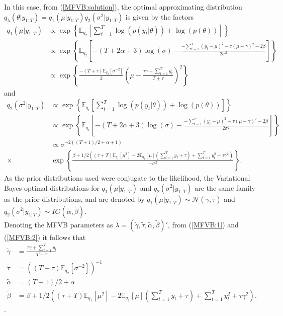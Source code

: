 \documentclass[
12pt, %
onehalfspacing, %
nohyperref, %
headsepline, %
chapterinoneline, %
]{MastersDoctoralThesis} %
\begin{document}
In this case, from (\ref{MFVB:solution}), the optimal approximating distribution  \\ $q_{\lambda}(\theta | y_{1:T}) = q_1(\mu | y_{1:T})q_2(\sigma^2 | y_{1:T})$ is given by the factors
\begin{align}
q_1(\mu | y_{1:T}) &\propto \exp \left\{\mathbb{E}_{q_2} \left[ \sum_{t=1}^T \log(p(y_t | \theta)) + \log(p(\theta)) \right] \right\} \\ 
&\propto \exp \left\{ \mathbb{E}_{q_2} \left[ -(T + 2\alpha + 3)\log(\sigma) - \frac{-\sum_{t=1}^T (y_t - \mu)^2 -\tau (\mu - \gamma)^2 - 2\beta}{2 \sigma^2} \right] \right\} \\
&\propto \exp \left\{ \frac{-(T + \tau) \mathbb{E}_{q_2}[\sigma^{-2}]}{2} \left( \mu - \frac{\tau \gamma + \sum_{t=1}^{T} y_t}{T + \tau} \right)^2 \right\} \label{MFVB:1}
\end{align}
and
\begin{align}
q_2(\sigma^2 | y_{1:T})  &\propto \exp \left\{\mathbb{E}_{q_1} \left[ \sum_{t=1}^T \log(p(y_t | \theta)) + \log(p(\theta)) \right] \right\} \\ 
&\propto \exp \left\{ \mathbb{E}_{q_1} \left[ -(T + 2\alpha + 3)\log(\sigma) - \frac{-\sum_{t=1}^T (y_t - \mu)^2 -\tau (\mu - \gamma)^2 - 2\beta}{2 \sigma^2} \right] \right\} \\
&\propto \sigma^{-2((T+1)/2 + \alpha + 1)} \nonumber \\
\times &\exp \left\{ \frac{ \beta + 1/2\left((\tau + T)\mathbb{E}_{q_1}[\mu^2] - 2 \mathbb{E}_{q_1}[\mu ]\left(\sum_{t=1}^{T}y_t + \tau \right) + \sum_{t=1}^{T} y_t^2 + \tau \gamma^2\right)}{-\sigma^2} \right\}. \label{MFVB:2}
\end{align}
As the prior distributions used were conjugate to the likelihood, the Variational Bayes optimal distributions for $q_1(\mu |  y_{1:T})$ and $q_2(\sigma^2 | y_{1:T})$ are the same family as the prior distributions, and are denoted by $q_1(\mu | y_{1:T}) \sim \mathcal{N}(\tilde{\gamma}, \tilde{\tau})$ and $q_2(\sigma^2 | y_{1:T}) \sim IG(\tilde{\alpha}, \tilde{\beta})$. 
\\

Denoting the MFVB parameters as $\lambda = (\tilde{\gamma}, \tilde{\tau}, \tilde{\alpha}, \tilde{\beta})'$, from (\ref{MFVB:1}) and (\ref{MFVB:2}) it follows that
\begin{align}
\tilde{\gamma} &= \frac{\tau \gamma + \sum_{t=1}^{T} y_t}{T + \tau}  \label{MFVB:3} \\ 
\tilde{\tau} &= \left((T + \tau)\mathbb{E}_{q_2}[\sigma^{-2}]\right )^{-1} \label{MFVB:4} \\
\tilde{\alpha} &= (T+1)/2 + \alpha  \label{MFVB:5} \\
\tilde{\beta} &= \beta + 1/2\left((\tau + T)\mathbb{E}_{q_1}[\mu^2 ]- 2 \mathbb{E}_{q_1}[\mu ]\left(\sum_{t=1}^{T}y_t + \tau\right) + \sum_{t=1}^{T} y_t^2 + \tau \gamma^2 \right). \label{MFVB:6}
\end{align}.
\end{document}
